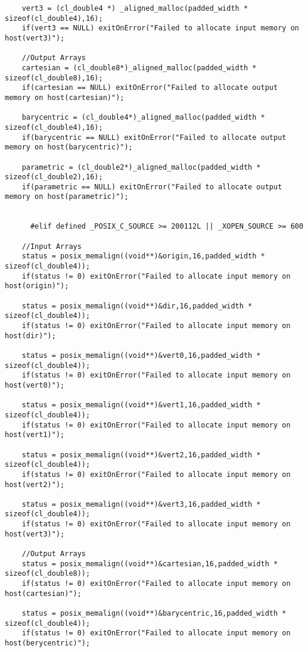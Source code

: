 \begin{verbatim}
	vert3 = (cl_double4 *) _aligned_malloc(padded_width * sizeof(cl_double4),16);
	if(vert3 == NULL) exitOnError("Failed to allocate input memory on host(vert3)");

	//Output Arrays
	cartesian = (cl_double8*)_aligned_malloc(padded_width * sizeof(cl_double8),16);
	if(cartesian == NULL) exitOnError("Failed to allocate output memory on host(cartesian)");
	
	barycentric = (cl_double4*)_aligned_malloc(padded_width * sizeof(cl_double4),16);
	if(barycentric == NULL) exitOnError("Failed to allocate output memory on host(barycentric)");
	
	parametric = (cl_double2*)_aligned_malloc(padded_width * sizeof(cl_double2),16);
	if(parametric == NULL) exitOnError("Failed to allocate output memory on host(parametric)");
	

      #elif defined _POSIX_C_SOURCE >= 200112L || _XOPEN_SOURCE >= 600	
	
	//Input Arrays
	status = posix_memalign((void**)&origin,16,padded_width * sizeof(cl_double4));
	if(status != 0) exitOnError("Failed to allocate input memory on host(origin)");

	status = posix_memalign((void**)&dir,16,padded_width * sizeof(cl_double4));
	if(status != 0) exitOnError("Failed to allocate input memory on host(dir)");

	status = posix_memalign((void**)&vert0,16,padded_width * sizeof(cl_double4));
	if(status != 0) exitOnError("Failed to allocate input memory on host(vert0)");

	status = posix_memalign((void**)&vert1,16,padded_width * sizeof(cl_double4));
	if(status != 0) exitOnError("Failed to allocate input memory on host(vert1)");

	status = posix_memalign((void**)&vert2,16,padded_width * sizeof(cl_double4));
	if(status != 0) exitOnError("Failed to allocate input memory on host(vert2)");

	status = posix_memalign((void**)&vert3,16,padded_width * sizeof(cl_double4));
	if(status != 0) exitOnError("Failed to allocate input memory on host(vert3)");

	//Output Arrays
	status = posix_memalign((void**)&cartesian,16,padded_width * sizeof(cl_double8));
	if(status != 0) exitOnError("Failed to allocate input memory on host(cartesian)");
	
	status = posix_memalign((void**)&barycentric,16,padded_width * sizeof(cl_double4));
	if(status != 0) exitOnError("Failed to allocate input memory on host(berycentric)");
	

\end{verbatim}
